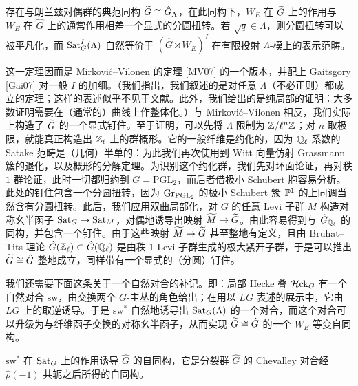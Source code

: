 \begin{theorem}%
存在与朗兰兹对偶群的典范同构 $\widetilde{G}\cong\hat G_\Lambda$，在此同构下，$W_E$ 在 $\widetilde{G}$ 上的作用与 $W_E$ 在 $\hat G$ 上的通常作用相差一个显式的分圆扭转。若 $\sqrt q\in\Lambda$，则分圆扭转可以被平凡化，而 $\operatorname{Sat}^I_G(\Lambda)$ 自然等价于 $(\hat G\rtimes W_E)^I$ 在有限投射 $\Lambda$-模上的表示范畴。
\end{theorem}

这一定理因而是 Mirković–Vilonen 的定理 [MV07] 的一个版本，并配上 Gaitsgory [Gai07] 对一般 $I$ 的加细。（我们指出，我们叙述的是对任意 $\Lambda$（不必正则）都成立的定理；这样的表述似乎不见于文献。此外，我们给出的是纯局部的证明：大多数证明需要在（通常的）曲线上作整体化。）与 Mirković–Vilonen 相反，我们实际上构造了 $\widetilde{G}$ 的一个显式钉住。至于证明，可以先将 $\Lambda$ 限制为 $\mathbb{Z}/\ell^n\mathbb{Z}$；对 $n$ 取极限，就能真正构造出 $\mathbb{Z}_\ell$ 上的群概形。它的一般纤维是约化的，因为 $\mathbb{Q}_\ell$-系数的 Satake 范畴是（几何）半单的：为此我们再次使用到 Witt 向量仿射 Grassmann 簇的退化，以及概形的分解定理。为识别这个约化群，我们先对环面论证，再对秩 $1$ 群论证，此时一切都归约到 $G=\mathrm{PGL}_2$，而后者借极小 Schubert 胞容易分析。此处的钉住包含一个分圆扭转，因为 $\mathrm{Gr}_{\mathrm{PGL}_2}$ 的极小 Schubert 簇 $\mathbb{P}^1$ 的上同调当然含有分圆扭转。此后，我们应用双曲局部化，对 $G$ 的任意 Levi 子群 $M$ 构造对称幺半函子 $\operatorname{Sat}_G\to\operatorname{Sat}_M$，对偶地诱导出映射 $\widetilde{M}\to\widetilde{G}$。由此容易得到与 $\hat G_{\mathbb{Q}_\ell}$ 的同构，并包含一个钉住。由于这些映射 $\widetilde{M}\to\widetilde{G}$ 甚至整地有定义，且由 Bruhat–Tits 理论 $\hat G(\mathbb{Z}_\ell)\subset\hat G(\mathbb{Q}_\ell)$ 是由秩 $1$ Levi 子群生成的极大紧开子群，于是可以推出 $\widetilde{G}\cong\hat G$ 整地成立，同样带有一个显式的（分圆）钉住。

我们还需要下面这条关于一个自然对合的补记。即：局部 Hecke 叠 $\mathcal{H}\mathrm{ck}_G$ 有一个自然对合 $\mathrm{sw}$，由交换两个 $G$-主丛的角色给出；在用以 $LG$ 表述的展示中，它由 $LG$ 上的取逆诱导。于是 $\mathrm{sw}^*$ 自然地诱导出 $\operatorname{Sat}_G(\Lambda)$ 的一个对合，而这个对合可以升级为与纤维函子交换的对称幺半函子，从而实现 $\widetilde{G}\cong\hat G$ 的一个 $W_E$-等变自同构。

\begin{proposition}%
$\mathrm{sw}^*$ 在 $\operatorname{Sat}_G$ 上的作用诱导 $\hat G$ 的自同构，它是分裂群 $\hat G$ 的 Chevalley 对合经 $\hat\rho(-1)$ 共轭之后所得的自同构。
\end{proposition}


